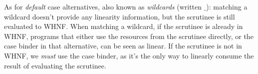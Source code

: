 \documentclass[acmsmall,review,anonymous,screen]{acmart}
\begin{document}


As for \emph{default} case alternatives, also known as \emph{wildcards}
(written $\_$): matching a wildcard doesn't provide any linearity information,
%
but the
scrutinee is still evaluated to WHNF.
%
%
When matching a wildcard, if the scrutinee is already in WHNF,
programs that either use the resources from the scrutinee directly, or the case
binder in that alternative, can be seen as linear. If the scrutinee is not in
WHNF, we \emph{must} use the case binder, as it's the only way to linearly
consume the result of evaluating the scrutinee.
\end{document}
